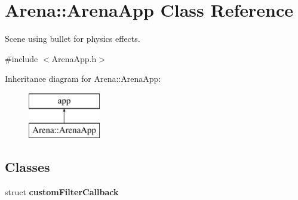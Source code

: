 \hypertarget{class_arena_1_1_arena_app}{\section{Arena\+:\+:Arena\+App Class Reference}
\label{class_arena_1_1_arena_app}
}


Scene using bullet for physics effects.  




{\ttfamily \#include $<$Arena\+App.\+h$>$}

Inheritance diagram for Arena\+:\+:Arena\+App\+:\begin{figure}[H]
\begin{center}
\leavevmode
\includegraphics[height=2.000000cm]{class_arena_1_1_arena_app}
\end{center}
\end{figure}
\subsection*{Classes}
\begin{DoxyCompactItemize}
\item 
struct {\bfseries custom\+Filter\+Callback}
\end{DoxyCompactItemize}

